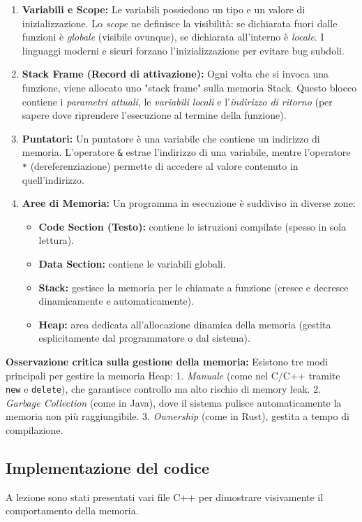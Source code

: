 \documentclass[12pt, a4paper]{article}
\begin{document}
\begin{enumerate}
    \item \textbf{Variabili e Scope:} Le variabili possiedono un tipo e un valore di inizializzazione. Lo \textit{scope} ne definisce la visibilità: se dichiarata fuori dalle funzioni è \textit{globale} (visibile ovunque), se dichiarata all'interno è \textit{locale}. I linguaggi moderni e sicuri forzano l'inizializzazione per evitare bug subdoli.
    \item \textbf{Stack Frame (Record di attivazione):} Ogni volta che si invoca una funzione, viene allocato uno "stack frame" sulla memoria Stack. Questo blocco contiene i \textit{parametri attuali}, le \textit{variabili locali} e l'\textit{indirizzo di ritorno} (per sapere dove riprendere l'esecuzione al termine della funzione). 
    \item \textbf{Puntatori:} Un puntatore è una variabile che contiene un indirizzo di memoria. L'operatore \texttt{\&} estrae l'indirizzo di una variabile, mentre l'operatore \texttt{*} (dereferenziazione) permette di accedere al valore contenuto in quell'indirizzo.
    \item \textbf{Aree di Memoria:} Un programma in esecuzione è suddiviso in diverse zone:
    \begin{itemize}
        \item \textbf{Code Section (Testo):} contiene le istruzioni compilate (spesso in sola lettura).
        \item \textbf{Data Section:} contiene le variabili globali.
        \item \textbf{Stack:} gestisce la memoria per le chiamate a funzione (cresce e decresce dinamicamente e automaticamente).
        \item \textbf{Heap:} area dedicata all'allocazione dinamica della memoria (gestita esplicitamente dal programmatore o dal sistema).
    \end{itemize}
\end{enumerate}

\textbf{Osservazione critica sulla gestione della memoria:} Esistono tre modi principali per gestire la memoria Heap:
1. \textit{Manuale} (come nel C/C++ tramite \texttt{new} e \texttt{delete}), che garantisce controllo ma alto rischio di memory leak.
2. \textit{Garbage Collection} (come in Java), dove il sistema pulisce automaticamente la memoria non più raggiungibile.
3. \textit{Ownership} (come in Rust), gestita a tempo di compilazione.

\subsection{Implementazione del codice}
A lezione sono stati presentati vari file C++ per dimostrare visivamente il comportamento della memoria.
\end{document}
